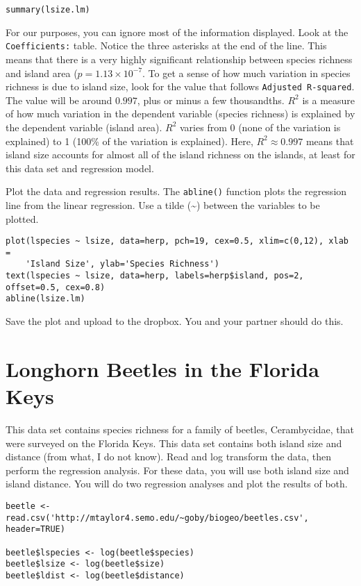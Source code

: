 \documentclass[11pt]{article}
\begin{document}
\begin{verbatim}
summary(lsize.lm)

\end{verbatim}

For our purposes, you can ignore most of the information displayed.  Look at the \texttt{Coefficients:} table. Notice the three asterisks at the end of the line.  This means that there is a very highly significant relationship between species richness and island area ($p = 1.13 \times 10^{-7}$.  To get a sense of how much variation in species richness is due to island size, look for the value that follows \texttt{Adjusted R-squared}. The value will be around $0.997$, plus or minus a few thousandths.  $R^2$ is a measure of how much variation in the dependent variable (species richness) is explained by the dependent variable (island area). $R^2$ varies from 0 (none of the variation is explained) to 1 (100\% of the variation is explained). Here, $R^2 \approx 0.997$ means that island size accounts for almost all of the island richness on the islands, at least for this data set and regression model.

Plot the data and regression results.  The \texttt{abline()} function plots the regression line from the linear regression.  Use a tilde (\textasciitilde) between the variables to be plotted.

\begin{verbatim}
plot(lspecies ~ lsize, data=herp, pch=19, cex=0.5, xlim=c(0,12), xlab = 
    'Island Size', ylab='Species Richness')
text(lspecies ~ lsize, data=herp, labels=herp$island, pos=2, offset=0.5, cex=0.8)
abline(lsize.lm)
\end{verbatim}

Save the plot and upload to the dropbox. You and your partner should do this.


\section{Longhorn Beetles in the Florida Keys}

This data set contains species richness for a family of beetles, Cerambycidae, that were surveyed on the Florida Keys. This data set contains both island size and distance (from what, I do not know).  Read and log transform the data, then perform the regression analysis.  For these data, you will use both island size and island distance.  You will do two regression analyses and plot the results of both.

\begin{verbatim}
beetle <- read.csv('http://mtaylor4.semo.edu/~goby/biogeo/beetles.csv', header=TRUE)

beetle$lspecies <- log(beetle$species)
beetle$lsize <- log(beetle$size)
beetle$ldist <- log(beetle$distance)

\end{verbatim}
\end{document}
